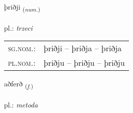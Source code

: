 \documentclass[frontgrid, backgrid]{flacards}\usepackage[]{graphicx}\usepackage[]{xcolor}
\begin{document}
\renewcommand{\blhead}{\vskip5pt {\small\bfseries\footnotesize Töluorð | liczebnik }}
\renewcommand{\bcfoot}{\vskip5pt \hspace{2pt}{\small\bfseries\footnotesize 1K}}


{þriðji \small{\textsubscript{(\textit{num.})}} \\[1ex] %
\textphonetic{[θrɪðjɪ]} \\
pl.: \emph{trzeci} \\  [2ex]
\renewcommand*{\arraystretch}{0.8}
\begin{tabular}{ll}
\textsc{sg.nom.}: & þriðji  --  þriðja -- þriðja \\ 
\textsc{pl.nom.}: & þriðju -- þriðju -- þriðju
\end{tabular}
}

\renewcommand{\flhead}{\vskip5pt \fboxsep=0pt {\small\bfseries\footnotesize Nafnorð | rzeczownik}}
\renewcommand{\fcfoot}{\vskip5pt \fboxsep=0pt \hspace{2pt}{\small\bfseries\footnotesize 1K}}

\renewcommand{\blhead}{\vskip5pt {\small\bfseries\footnotesize Nafnorð | rzeczownik }}
\renewcommand{\bcfoot}{\vskip5pt \hspace{2pt}{\small\bfseries\footnotesize 1K}}


{aðferð \small{\textsubscript{(\textit{f.})}} \\[1ex] %
\textphonetic{[aðfɛrð]} \\
pl.: \emph{metoda} \\  [2ex]
\renewcommand*{\arraystretch}{0.8}
}

\renewcommand{\flhead}{\vskip5pt \fboxsep=0pt {\small\bfseries\footnotesize Fornafn | zaimek}}
\renewcommand{\fcfoot}{\vskip5pt \fboxsep=0pt \hspace{2pt}{\small\bfseries\footnotesize 1K}}
\end{document}

